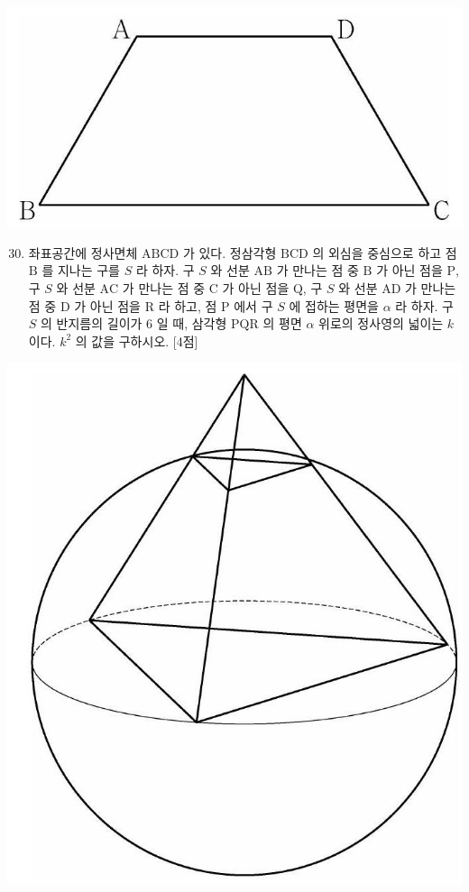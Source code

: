 \documentclass[10pt]{article}
\begin{document}
\begin{center}
\includegraphics[max width=\textwidth]{2023_06_06_b380aa8523ec7afae994g-40(1)}
\end{center}

\begin{enumerate}
  \setcounter{enumi}{29}
  \item 좌표공간에 정사면체 $\mathrm{ABCD}$ 가 있다. 정삼각형 $\mathrm{BCD}$ 의 외심을 중심으로 하고 점 $\mathrm{B}$ 를 지나는 구를 $S$ 라 하자. 구 $S$ 와 선분 $\mathrm{AB}$ 가 만나는 점 중 $\mathrm{B}$ 가 아닌 점을 $\mathrm{P}$, 구 $S$ 와 선분 $\mathrm{AC}$ 가 만나는 점 중 $\mathrm{C}$ 가 아닌 점을 $\mathrm{Q}$, 구 $S$ 와 선분 $\mathrm{AD}$ 가 만나는 점 중 $\mathrm{D}$ 가 아닌 점을 $\mathrm{R}$ 라 하고, 점 $\mathrm{P}$ 에서 구 $S$ 에 접하는 평면을 $\alpha$ 라 하자. 구 $S$ 의 반지름의 길이가 6 일 때, 삼각형 $\mathrm{PQR}$ 의 평면 $\alpha$ 위로의 정사영의 넓이는 $k$ 이다. $k^{2}$ 의 값을 구하시오. [4점]
\end{enumerate}

\begin{center}
\includegraphics[max width=\textwidth]{2023_06_06_b380aa8523ec7afae994g-40}
\end{center}
\end{document}
